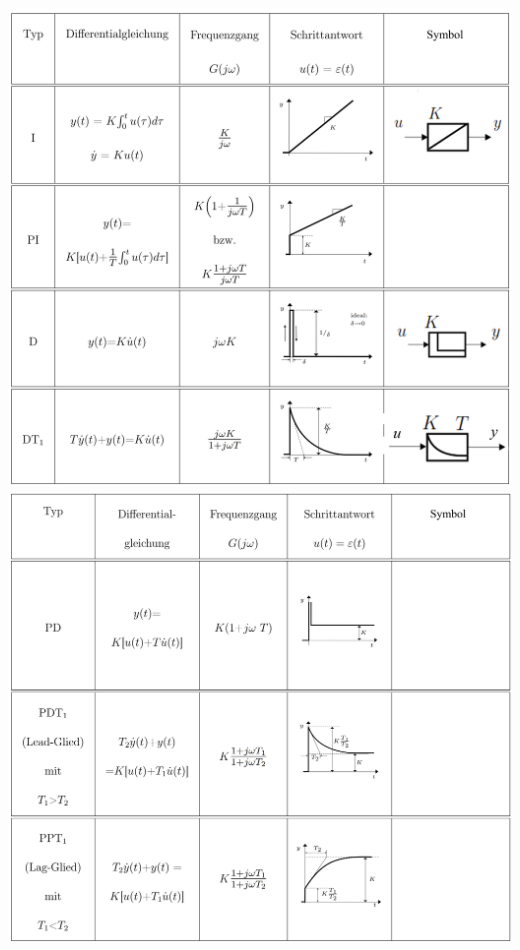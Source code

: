 			\includegraphics[width=13.5 cm]{./bilder/grundglieder/tabelle/glieder3.png} \\
			\includegraphics[width=13.5 cm]{./bilder/grundglieder/tabelle/glieder4.png} \\
